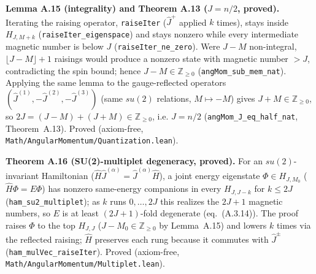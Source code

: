 \documentclass[a4paper,11pt]{article}
\begin{document}
\medskip\noindent\textbf{Lemma A.15 (integrality) and Theorem A.13 ($J=n/2$, proved).}  Iterating the
raising operator, \texttt{raiseIter} ($\hat J^+$ applied $k$ times), stays inside $H_{J,M+k}$
(\texttt{raiseIter\_eigenspace}) and stays nonzero while every intermediate magnetic number is
below $J$ (\texttt{raiseIter\_ne\_zero}).  Were $J-M$ non-integral, $\lfloor J-M\rfloor+1$ raisings
would produce a nonzero state with magnetic number ${>}J$, contradicting the spin bound; hence
$J-M\in\mathbb Z_{\ge0}$ (\texttt{angMom\_sub\_mem\_nat}).  Applying the same lemma to the
gauge-reflected operators $(\hat J^{(1)},-\hat J^{(2)},-\hat J^{(3)})$ (same $su(2)$ relations,
$M\mapsto-M$) gives $J+M\in\mathbb Z_{\ge0}$, so $2J=(J-M)+(J+M)\in\mathbb Z_{\ge0}$, i.e. $J=n/2$
(\texttt{angMom\_J\_eq\_half\_nat}, Theorem~A.13).  Proved (axiom-free,
\texttt{Math/AngularMomentum/Quantization.lean}).

\medskip\noindent\textbf{Theorem A.16 (SU(2)-multiplet degeneracy, proved).}  For an
$su(2)$-invariant Hamiltonian ($\hat H\hat J^{(\alpha)}=\hat J^{(\alpha)}\hat H$), a joint energy
eigenstate $\Phi\in H_{J,M_0}$ ($\hat H\Phi=E\Phi$) has nonzero same-energy companions in every
$H_{J,J-k}$ for $k\le 2J$ (\texttt{ham\_su2\_multiplet}); as $k$ runs $0,\dots,2J$ this realizes the
$2J+1$ magnetic numbers, so $E$ is at least $(2J+1)$-fold degenerate (eq.~(A.3.14)).  The proof
raises $\Phi$ to the top $H_{J,J}$ ($J-M_0\in\mathbb Z_{\ge0}$ by Lemma~A.15) and lowers $k$ times
via the reflected raising; $\hat H$ preserves each rung because it commutes with $\hat J^\pm$
(\texttt{ham\_mulVec\_raiseIter}).  Proved (axiom-free,
\texttt{Math/AngularMomentum/Multiplet.lean}).
\end{document}
